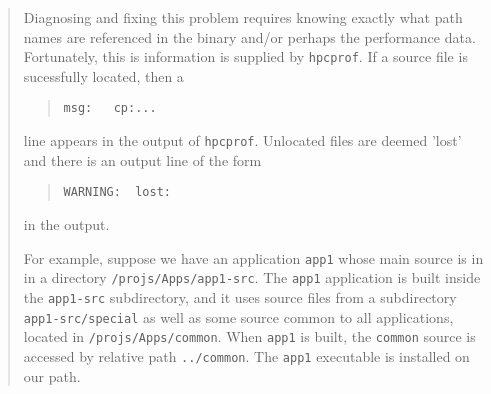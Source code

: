 \documentclass{article}
\newcommand{\hpcprof}{\texttt{hpcprof}}
\begin{document}
\begin{quote}
Diagnosing and fixing this problem requires knowing exactly what path
names are referenced in the binary and/or perhaps the performance
data. Fortunately, this is information is supplied by \hpcprof .
If a source file is sucessfully located, then a 
\begin{quote}
\verb|msg:   cp:...|
\end{quote}
line appears in the output of \hpcprof . Unlocated files are deemed 'lost'
and there is an output line of the form 
\begin{quote}
\verb|WARNING:  lost:|
\end{quote}
in the output.

\begin{comment}
 It might be better to have three lost files in the example: one without a path
	interp.c
one with a relative path like 
	solve/solvermain.c
and one with a path like
	../../lib/math.c

        In all cases, the path passed to hpcprof with a -I flag should
        be a directory from which the relative path will reach the
        missing source file.
\end{comment}

For example, suppose we have an application \verb|app1| whose main source 
is in in a directory \verb|/projs/Apps/app1-src|. The \verb|app1|
application is built inside the \verb|app1-src| subdirectory, and it uses
source files from a subdirectory \verb|app1-src/special| as well as some
source common to all applications, located in
\verb|/projs/Apps/common|. When \verb|app1| is built, the
\verb|common| source is accessed by relative path \verb|../common|.
The \verb|app1| executable is installed on our path.


\end{quote}
\end{document}
